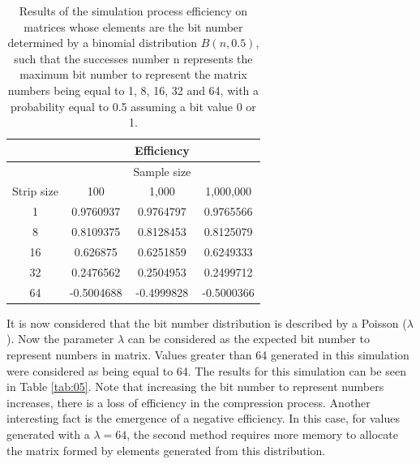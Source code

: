 \documentclass[10pt]{article}
\begin{document}
\begin{table}[h]
  \centering
  \caption{Results of the simulation process efficiency on matrices whose elements are the bit number determined by a binomial distribution $B(n,0.5)$, such that the successes number n represents the maximum bit number to represent the matrix numbers being equal to 1, 8, 16, 32 and 64, with a probability equal to 0.5 assuming a bit value 0 or 1.}
 \begin{tabular}{cccc}
    \hline
			& 		&Efficiency         & \\
    \hline
			&  		&Sample size & \\
    Strip size		& 100		& 1,000		    & 1,000,000 \\
    \hline
     1 			&  0.9760937	& 0.9764797 	    & 0.9765566 \\
     8			&  0.8109375	& 0.8128453 	    & 0.8125079 \\
     16			&  0.626875	& 0.6251859 	    & 0.6249333 \\
     32			&  0.2476562	& 0.2504953 	    & 0.2499712 \\
     64			&  -0.5004688	& -0.4999828 	    & -0.5000366 \\
    \hline
 \end{tabular}
 \label{tab:04}
\end{table}

It is now considered that the bit number distribution is described by a Poisson ($\lambda$). Now the parameter $\lambda$ can be considered as the expected bit number  to represent numbers in matrix. Values ​​greater than 64 generated in this simulation were considered as being equal to 64. The results for this simulation can be seen in Table \ref{tab:05}. Note that increasing the bit number to represent numbers increases, there is a loss of efficiency in the compression process. Another interesting fact is the emergence of a negative efficiency. In this case, for values ​​generated with a $\lambda=64$, the second method requires more memory to allocate the matrix formed by elements generated from this distribution.
\end{document}
